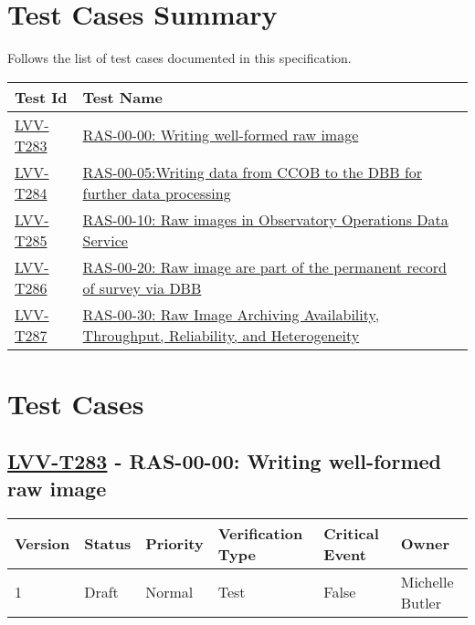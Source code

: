 \section{Test Cases Summary}\label{test-cases-summary}

Follows the list of test cases documented in this specification.

\begin{longtable}[]{p{3cm}p{13cm}}
\toprule
Test Id & Test Name\tabularnewline
\midrule
\endhead
    \hyperref[lvv-t283]{LVV-T283} &
    \href{https://jira.lsstcorp.org/secure/Tests.jspa\#/testCase/LVV-T283}{RAS-00-00: Writing well-formed raw image} \tabularnewline
    \hyperref[lvv-t284]{LVV-T284} &
    \href{https://jira.lsstcorp.org/secure/Tests.jspa\#/testCase/LVV-T284}{RAS-00-05:Writing data from CCOB to the DBB for further data processing} \tabularnewline
    \hyperref[lvv-t285]{LVV-T285} &
    \href{https://jira.lsstcorp.org/secure/Tests.jspa\#/testCase/LVV-T285}{RAS-00-10: Raw images in Observatory Operations Data Service} \tabularnewline
    \hyperref[lvv-t286]{LVV-T286} &
    \href{https://jira.lsstcorp.org/secure/Tests.jspa\#/testCase/LVV-T286}{RAS-00-20: Raw image are part of the permanent record of survey via DBB} \tabularnewline
    \hyperref[lvv-t287]{LVV-T287} &
    \href{https://jira.lsstcorp.org/secure/Tests.jspa\#/testCase/LVV-T287}{RAS-00-30: Raw Image Archiving Availability, Throughput, Reliability, and Heterogeneity} \tabularnewline
\bottomrule
\end{longtable}

\newpage

\section{Test Cases}

\subsection{\href{https://jira.lsstcorp.org/secure/Tests.jspa\#/testCase/LVV-T283}{LVV-T283}
    - RAS-00-00: Writing well-formed raw image}\label{lvv-t283}

\begin{longtable}[]{llllll}
\toprule
Version & Status & Priority & Verification Type & Critical Event & Owner
\\\midrule
1 & Draft & Normal &
Test & False & Michelle Butler
\\\bottomrule
\end{longtable}

